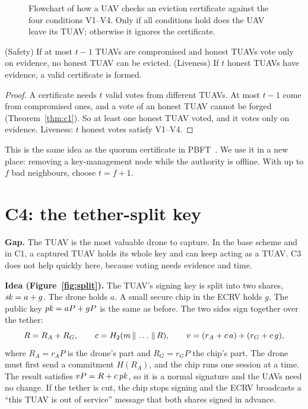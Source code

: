 \documentclass[11pt,openany]{report}
\begin{document}
\begin{figure}[H]
\centering
\resizebox{0.9\linewidth}{!}{}
\caption{Flowchart of how a UAV checks an eviction certificate against the four conditions V1--V4. Only if all conditions hold does the UAV leave
its TUAV; otherwise it ignores the certificate.}
\label{fig:c3flow}
\end{figure}

\begin{theorem}\label{thm:c3}
(Safety) If at most $t-1$ TUAVs are compromised and honest TUAVs vote only on evidence, no honest TUAV can be evicted. (Liveness) If $t$ honest TUAVs
have evidence, a valid certificate is formed.
\end{theorem}
\begin{proof}
A certificate needs $t$ valid votes from different TUAVs. At most $t-1$ come from compromised ones, and a vote of an honest TUAV cannot be forged
(Theorem~\ref{thm:c1}). So at least one honest TUAV voted, and it votes only on evidence. Liveness: $t$ honest votes satisfy V1--V4.
\end{proof}
This is the same idea as the quorum certificate in PBFT~\cite{castro99}. We use it in a new place: removing a key-management node while the authority
is offline. With up to $f$ bad neighbours, choose $t=f+1$.

\section{C4: the tether-split key}\label{sec:c4}
\textbf{Gap.} The TUAV is the most valuable drone to capture. In the base scheme and in C1, a captured TUAV holds its whole key and can keep acting as
a TUAV. C3 does not help quickly here, because voting needs evidence and time.

\textbf{Idea (Figure~\ref{fig:split}).} The TUAV's signing key is split into two shares, $\mathit{sk}=a+g$. The drone holds $a$. A small secure chip in the
ECRV holds $g$. The public key $\mathit{pk}=aP+gP$ is the same as before. The two sides sign together over the tether:
\[ R=R_A+R_G,\qquad c=H_2(m\,\|\,\dots\,\|\, R),\qquad v=(r_A+c\,a)+(r_G+c\,g), \]
where $R_A=r_AP$ is the drone's part and $R_G=r_GP$ the chip's part. The drone must first send a commitment $H(R_A)$, and the chip runs one session
at a time. The result satisfies $vP=R+c\,\mathit{pk}$, so it is a normal signature and the UAVs need no change. If the tether is cut, the chip stops signing
and the ECRV broadcasts a ``this TUAV is out of service'' message that both shares signed in advance.
\end{document}
